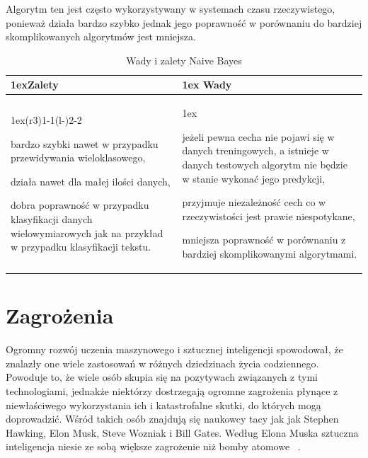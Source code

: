 Algorytm ten jest często wykorzystywany w systemach czasu rzeczywistego, ponieważ działa bardzo szybko jednak
jego poprawność w porównaniu do bardziej skomplikowanych algorytmów jest mniejsza.
\begin{table}[h]
    \begin{tabularx}{\linewidth}{>{\parskip1ex}X@{\kern4\tabcolsep}>{\parskip1ex}X}
    \toprule
    \hfil\bfseries Zalety
    &
    \hfil\bfseries Wady
    \\\cmidrule(r{3\tabcolsep}){1-1}\cmidrule(l{-\tabcolsep}){2-2}
    
    bardzo szybki nawet w przypadku przewidywania wieloklasowego,\par
    działa nawet dla małej ilości danych,\par
    dobra poprawność w przypadku klasyfikacji danych wielowymiarowych
    jak na przykład w przypadku klasyfikacji tekstu.\par
    
    &
    
    jeżeli pewna cecha nie pojawi się w danych treningowych, a istnieje w danych 
    testowych algorytm nie będzie w stanie wykonać jego predykcji,\par
    przyjmuje niezależność cech co w rzeczywistości jest prawie niespotykane,\par
    mniejsza poprawność w porównaniu z bardziej skomplikowanymi algorytmami.\par
    
    \\\bottomrule
    \end{tabularx}
    \caption{Wady i zalety Naive Bayes}
\end{table}

\section{Zagrożenia}
Ogromny rozwój uczenia maszynowego i sztucznej inteligencji spowodował, że znalazły one 
wiele zastosowań w różnych dziedzinach życia codziennego. Powoduje to, że wiele osób skupia się 
na pozytywach związanych
z tymi technologiami, jednakże niektórzy dostrzegają ogromne zagrożenia płynące z niewłaściwego 
wykorzystania ich i katastrofalne skutki, do których mogą doprowadzić. 
Wśród takich osób znajdują się naukowcy tacy jak jak Stephen Hawking, Elon Musk, Steve Wozniak i Bill Gates. 
Według Elona Muska sztuczna inteligencja niesie ze sobą większe zagrożenie niż bomby atomowe ~\cite{dangers}. 

